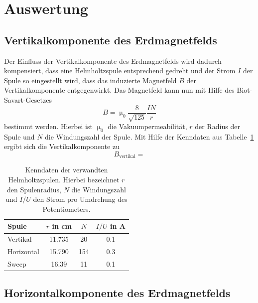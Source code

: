 

\section{Auswertung}
\label{sec:auswertung}

\subsection{Vertikalkomponente des Erdmagnetfelds}
\label{sub:vertikalkomponente_des_erdmagnetfelds}

Der Einfluss der Vertikalkomponente des Erdmagnetfelds wird dadurch
kompensiert, dass eine Helmholtzspule entsprechend gedreht und der Strom $I$ der
Spule so eingestellt wird, dass das induzierte Magnetfeld $B$ der
Vertikalkomponente entgegenwirkt. Das Magnetfeld kann nun mit Hilfe des
Biot-Savart-Gesetzes
\begin{equation}
  B = \upmu_0 \frac{8}{\sqrt{125}} \frac{I N}{r}
  \label{eq:biot}
\end{equation}
bestimmt werden.
Hierbei ist $\upmu_0$ die Vakuumpermeabilität, $r$ der Radius der Spule und $N$
die Windungszahl der Spule. Mit Hilfe der Kenndaten aus
Tabelle~\ref{tab:kenndaten_spulen} ergibt sich die Vertikalkomponente zu
\begin{equation}
  B_\text{vertikal} = 
\end{equation}

\begin{table}[htpb]
  \centering
  \begin{tabular}{lccc}
    \midrule
    \midrule
    Spule & $r$ in \si{\centi\meter} & $N$ & $I/U$ in \si{\ampere} \\
    \midrule
    Vertikal   & 11.735           & \phantom{0}20 & 0.1 \\
    Horizontal & 15.790           & 154           & 0.3 \\
    Sweep      & 16.39\phantom{0} & \phantom{0}11 & 0.1 \\
    \midrule
    \midrule
  \end{tabular}
  \caption{Kenndaten der verwandten Helmholtzspulen. Hierbei bezeichnet $r$ den
    Spulenradius, $N$ die Windungszahl und $I/U$ den Strom pro Umdrehung des
    Potentiometers.}
\label{tab:kenndaten_spulen}
\end{table}

\subsection{Horizontalkomponente des Erdmagnetfelds}
\label{sub:horizontalkomponente_des_erdmagnetfelds}

